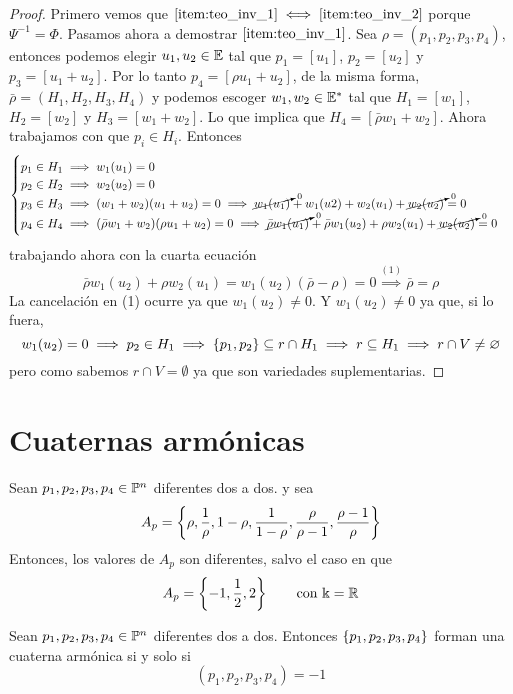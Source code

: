 \begin{proof}
 Primero vemos que $\ref{item:teo_inv_1} \iff \ref{item:teo_inv_2}$ porque $\Psi^{-1}=\Phi$. Pasamos ahora
 a demostrar $\ref{item:teo_inv_1}$. Sea $\rho = (p_1,p_2,p_3,p_4)$, entonces podemos elegir $u_1,u_2 \in \mathbb{E}$
 tal que $p_1 = [u_1]$, $p_2=[u_2]$ y $p_3=[u_1+u_2]$. Por lo tanto $p_4 = [\rho u_1+u_2]$, de la misma forma,
 $\bar{\rho} = (H_1,H_2,H_3,H_4)$ y podemos escoger $w_1,w_2 \in \mathbb{E}^*$ tal que $H_1 = [w_1]$, $H_2 = [w_2]$ y
 $H_3=[w_1+w_2]$. Lo que implica que $H_4 = [\bar{\rho} w_1 + w_2]$. Ahora trabajamos con que $p_i \in H_i$.
 Entonces
 \[
  \begin{cases}
    p_1 \in H_1 \implies w_1(u_1) = 0 \\
    p_2 \in H_2 \implies w_2(u_2) = 0 \\
    p_3 \in H_3 \implies (w_1+w_2)(u_1+u_2) = 0 \implies \cancelto{0}{w_1(u_1)} + w_1(u2) + w_2(u_1) + \cancelto{0}{w_2(u_2)} = 0 \\
    p_4 \in H_4 \implies (\bar{\rho}w_1+w_2)(\rho u_1+u_2) = 0 \implies \cancelto{0}{\bar{\rho}w_1(u_1)} + \bar{\rho}w_1(u_2) +
      \rho w_2(u_1) + \cancelto{0}{w_2(u_2)} = 0
  \end{cases}
 \]
 trabajando ahora con la cuarta ecuación
 \[
  \bar{\rho}w_1(u_2) + \rho w_2(u_1) = w_1(u_2)(\bar{\rho} - \rho) = 0 \stackrel{(1)}{\implies} \bar{\rho} = \rho
 \]
 La cancelación en (1) ocurre ya que $w_1(u_2) \neq 0$. Y $w_1(u_2) \neq 0$ ya que, si lo fuera,
 \[
  w_1(u_2) = 0 \implies p_2 \in H_1 \implies \left\{p_1,p_2\right\} \subseteq r \cap H_1 \implies r \subseteq H_1 \implies r \cap V \neq \varnothing
 \]
 pero como sabemos $r \cap V = \emptyset$ ya que son variedades suplementarias.
\end{proof}

\section{Cuaternas armónicas}

\begin{obs}
 Sean $p_1,p_2,p_3,p_4 \in \mathbb{P}^n$ diferentes dos a dos. y sea
 \[
  A_p = \left\{\rho, \frac{1}{\rho}, 1-\rho, \frac{1}{1-\rho}, \frac{\rho}{\rho-1},\frac{\rho-1}{\rho}\right\}
 \]
 Entonces, los valores de $A_p$ son diferentes, salvo el caso en que
 \[
  A_p = \left\{-1,\frac{1}{2},2\right\} \qquad \text{con $\Bbbk = \mathbb{R}$}
 \]
\end{obs}

\begin{defi}
 Sean $p_1,p_2,p_3,p_4 \in \mathbb{P}^n$ diferentes dos a dos. Entonces $\left\{p_1,p_2,p_3,p_4\right\}$ forman
 una cuaterna armónica si y solo si
 \[
  (p_1,p_2,p_3,p_4) = -1
 \]
\end{defi}

